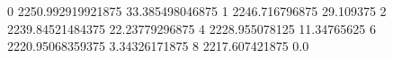 0 2250.992919921875 33.385498046875
1 2246.716796875 29.109375
2 2239.84521484375 22.23779296875
4 2228.955078125 11.34765625
6 2220.95068359375 3.34326171875
8 2217.607421875 0.0
